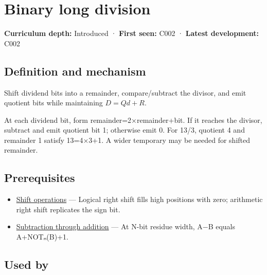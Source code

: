 \hypertarget{appendix-89985e6a2685}{}\label{referencestart:appendix-89985e6a2685}
\section{Binary long division}\label{appendix-89985e6a2685-binary-long-division}

\hypertarget{appendix-89985e6a2685-binary-long-division}{}

\textbf{Curriculum depth:} Introduced · \textbf{First seen:} C002 · \textbf{Latest development:} C002

\begin{allmightroledefinition}

\subsection{Definition and mechanism}\label{appendix-89985e6a2685-definition-and-mechanism}

\hypertarget{appendix-89985e6a2685-definition-and-mechanism}{}

Shift dividend bits into a remainder, compare/subtract the divisor, and emit quotient bits while maintaining \(D=Qd+R\).

\end{allmightroledefinition}

At each dividend bit, form remainder=2×remainder+bit. If it reaches the divisor, subtract and emit quotient bit 1; otherwise emit 0. For 13/3, quotient 4 and remainder 1 satisfy 13=4×3+1. A wider temporary may be needed for shifted remainder.

\subsection{Prerequisites}\label{appendix-89985e6a2685-prerequisites}

\hypertarget{appendix-89985e6a2685-prerequisites}{}

\begin{itemize}
\tightlist
\item
  \hyperref[appendix-73425b25118e]{Shift operations} --- Logical right shift fills high positions with zero; arithmetic right shift replicates the sign bit.
\item
  \hyperref[appendix-1c7df340573e]{Subtraction through addition} --- At N-bit residue width, A−B equals A+NOTₙ(B)+1.
\end{itemize}

\subsection{Used by}\label{appendix-89985e6a2685-used-by}

